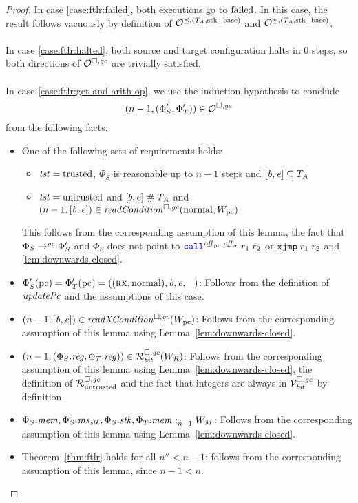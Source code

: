 \begin{proof}
  In case \ref{case:ftlr:failed}, both executions go to $\failed$.
  In this case, the result follows vacuously by definition of $\lrol$ and $\lror$.
  \\\\
  In case \ref{case:ftlr:halted}, both source and target configuration halts in 0
  steps, so both directions of $\lro$ are trivially satisfied.
  \\\\
  In case \ref{case:ftlr:get-and-arith-op}, we use the induction hypothesis to conclude
  \[
    \npair[n-1]{(\Phi_S',\Phi_T')} \in \lro
  \]
  from the following facts:
  \begin{itemize}
  \item One of the following sets of requirements holds:
    \begin{itemize}
    \item $\trust = \trusted$, $\Phi_S$ is reasonable up to $n-1$ steps and $[\baddr,\eaddr] \subseteq \ta$
    \item $\trust = \untrusted$ and $[b,e] \mathrel{\#} \ta$ and $\npair[n-1]{[\baddr,\eaddr]} \in \readCond{\normal,W_\pcreg}$
    \end{itemize}
    This follows from the corresponding assumption of this lemma, the fact that $\Phi_S \step[\gc] \Phi_S'$ and $\Phi_S$ does not point to $\scall{\offpc,\offsigma}{r_1}{r_2}$ or $\txjmp{r_1}{r_2}$ and \ref{lem:downwards-closed}.
  \item $\Phi_S'(\pcreg) = \Phi_T'(\pcreg) = ((\rx,\normal),\baddr,\eaddr,\_)$:
    Follows from the definition of $\updPcAddr{}$ and the assumptions of this case.
  \item $\npair[n-1]{[\baddr,\eaddr]} \in \xReadCond{W_\pcreg}$:
    Follows from the corresponding assumption of this lemma using Lemma~\ref{lem:downwards-closed}.
  \item $\npair[n-1]{(\Phi_S.\reg,\Phi_T.\reg)} \in \lrrg{\trust}(W_R)$:
    Follows from the corresponding assumption of this lemma using Lemma~\ref{lem:downwards-closed}, the definition of $\lrr$ and the fact that integers are always in $\lrvg{\trust}$ by definition.
  \item $\memSat[n-1]{\Phi_S.\mem,\Phi_S.\ms_\stk,\Phi_S.\stk,\Phi_T.\mem}{W_M}$:
    Follows from the corresponding assumption of this lemma using Lemma~\ref{lem:downwards-closed}.
  \item Theorem~\ref{thm:ftlr} holds for all $n'' < n-1$:
    follows from the corresponding assumption of this lemma, since $n - 1 < n$.
  \end{itemize}


\end{proof}
